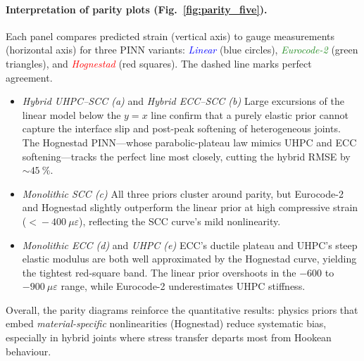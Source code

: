 \documentclass{article}
\begin{document}
\paragraph{Interpretation of parity plots
(Fig.~\ref{fig:parity_five}).}
Each panel compares predicted strain (vertical axis) to gauge
measurements (horizontal axis) for three PINN variants:
\textcolor{blue}{\emph{Linear}} (blue circles),
\textcolor[HTML]{228B22}{\emph{Eurocode-2}} (green triangles), and
\textcolor{red}{\emph{Hognestad}} (red squares).
The dashed line marks perfect agreement.

\begin{itemize}
  \item \emph{Hybrid UHPC–SCC (a)} and \emph{Hybrid ECC–SCC (b)}  
        Large excursions of the linear model below the
        $y=x$ line confirm that a purely elastic prior cannot capture the
        interface slip and post-peak softening of heterogeneous joints.
        The Hognestad PINN—whose parabolic-plateau law mimics UHPC and
        ECC softening—tracks the perfect line most closely, cutting the
        hybrid RMSE by $\sim\!45~\%$.
  \item \emph{Monolithic SCC (c)}  
        All three priors cluster around parity, but Eurocode-2 and
        Hognestad slightly outperform the linear prior at high
        compressive strain ($<\!-400~\mu\varepsilon$), reflecting the
        SCC curve’s mild nonlinearity.
  \item \emph{Monolithic ECC (d)} and \emph{UHPC (e)}  
        ECC’s ductile plateau and UHPC’s steep elastic modulus
        are both well approximated by the Hognestad curve, yielding the
        tightest red-square band.  The linear prior overshoots in the
        $-600$ to $-900~\mu\varepsilon$ range, while Eurocode-2
        underestimates UHPC stiffness.
\end{itemize}

Overall, the parity diagrams reinforce the quantitative results:
physics priors that embed \emph{material-specific} nonlinearities
(Hognestad) reduce systematic bias, especially in hybrid joints where
stress transfer departs most from Hookean behaviour.
\end{document}
